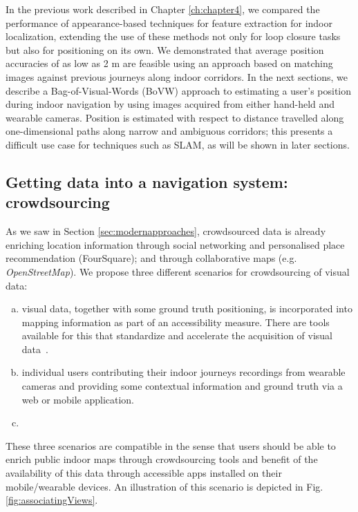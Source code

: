 In the previous work \citep{RiveraWearable} described in Chapter \ref{ch:chapter4}, we compared the performance of appearance-based techniques for feature extraction for indoor localization, extending the use of these methods not only for loop closure tasks but also for positioning on its own. We demonstrated that average position accuracies of as low as 2 m are feasible using an approach based on matching images against previous journeys along indoor corridors.  In the next sections, we describe a Bag-of-Visual-Words (BoVW) approach to estimating a user's position during indoor navigation by using images acquired from either hand-held and wearable cameras.  Position is estimated with respect to distance travelled along one-dimensional paths along narrow and ambiguous corridors; this presents a difficult use case for techniques such as SLAM, as will be shown in later sections.

\subsection{Getting data into a navigation system: crowdsourcing}
As we saw in Section \ref{sec:modernapproaches}, crowdsourced data is already enriching location information through social networking and personalised place recommendation (FourSquare); and through collaborative maps (e.g. {\it OpenStreetMap}). We propose three different scenarios for crowdsourcing of visual data:
\begin{enumerate}[a)] 
\item  visual data, together with some ground truth positioning, is incorporated into mapping information as part of an accessibility measure. There are tools available for this that standardize and accelerate the acquisition of visual data~\citep{navvisTrolley}.

\item individual users contributing their indoor journeys recordings from wearable cameras and providing some contextual information and ground truth via a web or mobile application. 

\item {}

\end{enumerate}



These three scenarios are compatible in the sense that users should be able to enrich public indoor maps through crowdsourcing tools and benefit of the availability of this data through accessible apps installed on their mobile/wearable devices. An illustration of this scenario is depicted in Fig. \ref{fig:associatingViews}.

